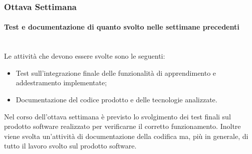 {    \subsubsection{Ottava Settimana}
    	\paragraph*{Test e documentazione di quanto svolto nelle settimane precedenti} \mbox{}\\ [1mm]
    	Le attività che devono essere svolte sono le seguenti:
        \begin{itemize}
        	\item Test sull'integrazione finale delle funzionalità di apprendimento e addestramento implementate;
        	\item Documentazione del codice prodotto e delle tecnologie analizzate.
        \end{itemize}
        Nel corso dell'ottava settimana è previsto lo svolgimento dei test finali sul prodotto software realizzato per verificarne il corretto funzionamento. Inoltre viene svolta un'attività di documentazione della codifica ma, più in generale, di tutto il lavoro svolto sul prodotto software.
}

\newcommand{\totaleOre}{}

\newcommand{\obiettiviObbligatori}{
	 \item \underline{\textit{O01}}: primo obiettivo;
	 \item \underline{\textit{O02}}: secondo obiettivo;
	 \item \underline{\textit{O03}}: terzo obiettivo;
	 
}

\newcommand{\obiettiviDesiderabili}{
	 \item \underline{\textit{D01}}: primo obiettivo;
	 \item \underline{\textit{D02}}: secondo obiettivo;
}

\newcommand{\obiettiviFacoltativi}{
	 \item \underline{\textit{F01}}: primo obiettivo;
	 \item \underline{\textit{F02}}: secondo obiettivo;
	 \item \underline{\textit{F03}}: terzo obiettivo;
}